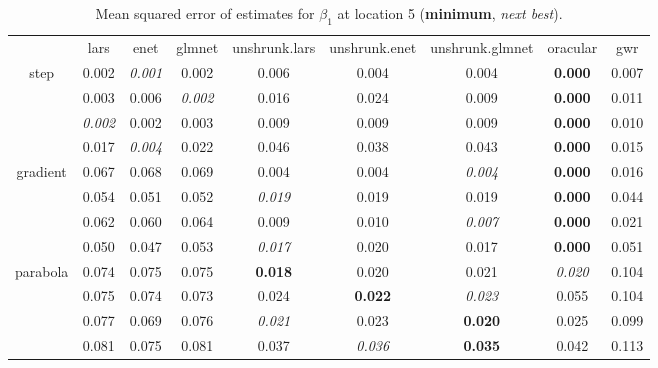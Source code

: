 \documentclass[authoryear, review, 11pt]{elsarticle}
\begin{document}
		\begin{table}[ht]
		\begin{center}
		\begin{tabular}{ccccccccc}
		  & lars & enet & glmnet & unshrunk.lars & unshrunk.enet & unshrunk.glmnet & oracular & gwr \\ 
		  \cline{2-9}
		  \multirow{4}{*}{step} & 0.002 & \emph{0.001} & 0.002 & 0.006 & 0.004 & 0.004 & \textbf{0.000} & 0.007 \\ 
		  & 0.003 & 0.006 & \emph{0.002} & 0.016 & 0.024 & 0.009 & \textbf{0.000} & 0.011 \\ 
		  & \emph{0.002} & 0.002 & 0.003 & 0.009 & 0.009 & 0.009 & \textbf{0.000} & 0.010 \\ 
		  & 0.017 & \emph{0.004} & 0.022 & 0.046 & 0.038 & 0.043 & \textbf{0.000} & 0.015 \\ 
		  \cline{2-9}
		  \multirow{4}{*}{gradient} & 0.067 & 0.068 & 0.069 & 0.004 & 0.004 & \emph{0.004} & \textbf{0.000} & 0.016 \\ 
		  & 0.054 & 0.051 & 0.052 & \emph{0.019} & 0.019 & 0.019 & \textbf{0.000} & 0.044 \\ 
		  & 0.062 & 0.060 & 0.064 & 0.009 & 0.010 & \emph{0.007} & \textbf{0.000} & 0.021 \\ 
		  & 0.050 & 0.047 & 0.053 & \emph{0.017} & 0.020 & 0.017 & \textbf{0.000} & 0.051 \\ 
		  \cline{2-9}
		  \multirow{4}{*}{parabola} & 0.074 & 0.075 & 0.075 & \textbf{0.018} & 0.020 & 0.021 & \emph{0.020} & 0.104 \\ 
		  & 0.075 & 0.074 & 0.073 & 0.024 & \textbf{0.022} & \emph{0.023} & 0.055 & 0.104 \\ 
		  & 0.077 & 0.069 & 0.076 & \emph{0.021} & 0.023 & \textbf{0.020} & 0.025 & 0.099 \\ 
		  & 0.081 & 0.075 & 0.081 & 0.037 & \emph{0.036} & \textbf{0.035} & 0.042 & 0.113 \\ 
		  \end{tabular}
		\caption{Mean squared error of estimates for $\beta_1$ at location 5 (\textbf{minimum}, \emph{next best}).\label{table:loc5-X1-MSEX}}
		\end{center}
		\end{table}
\end{document}
